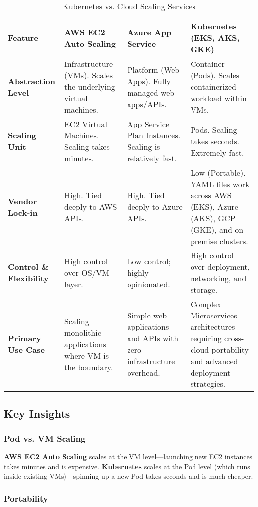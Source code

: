 \documentclass[12pt,a4paper]{article}
\begin{document}
\begin{table}[H]
\centering
\small
\begin{tabularx}{\textwidth}{|l|X|X|X|}
\toprule
\textbf{Feature} & \textbf{AWS EC2 Auto Scaling} & \textbf{Azure App Service} & \textbf{Kubernetes (EKS, AKS, GKE)} \\
\midrule
\textbf{Abstraction Level} &
Infrastructure (VMs). Scales the underlying virtual machines. &
Platform (Web Apps). Fully managed web apps/APIs. &
Container (Pods). Scales containerized workload within VMs. \\
\midrule
\textbf{Scaling Unit} &
EC2 Virtual Machines. Scaling takes minutes. &
App Service Plan Instances. Scaling is relatively fast. &
Pods. Scaling takes seconds. Extremely fast. \\
\midrule
\textbf{Vendor Lock-in} &
High. Tied deeply to AWS APIs. &
High. Tied deeply to Azure APIs. &
Low (Portable). YAML files work across AWS (EKS), Azure (AKS), GCP (GKE), and on-premise clusters. \\
\midrule
\textbf{Control \& Flexibility} &
High control over OS/VM layer. &
Low control; highly opinionated. &
High control over deployment, networking, and storage. \\
\midrule
\textbf{Primary Use Case} &
Scaling monolithic applications where VM is the boundary. &
Simple web applications and APIs with zero infrastructure overhead. &
Complex Microservices architectures requiring cross-cloud portability and advanced deployment strategies. \\
\bottomrule
\end{tabularx}
\caption{Kubernetes vs. Cloud Scaling Services}
\end{table}

\subsection{Key Insights}

\subsubsection{Pod vs. VM Scaling}

\textbf{AWS EC2 Auto Scaling} scales at the VM level—launching new EC2 instances takes minutes and is expensive. \textbf{Kubernetes} scales at the Pod level (which runs inside existing VMs)—spinning up a new Pod takes seconds and is much cheaper.

\subsubsection{Portability}
\end{document}
